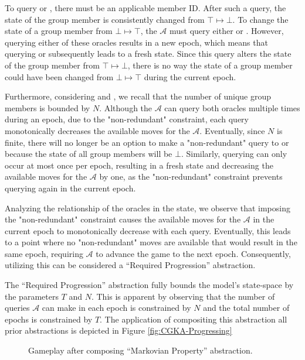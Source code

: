 \documentclass[runningheads]{llncs}
\newcommand{\Adversary}{\ensuremath{\mathcal{A}}\xspace}
\begin{document}
To query  or , there must be an applicable member ID.
After such a query, the state of the group member is consistently changed from $\top \mapsto \bot$.
To change the state of a group member from $\bot \mapsto \top$, the \Adversary must query either  or .
However, querying either of these oracles results in a new epoch, which means that querying  or  subsequently leads to a fresh state.
Since this query alters the state of the group member from $\top \mapsto \bot$, there is no way the state of a group member could have been changed from $\bot \mapsto \top$ during the current epoch.

Furthermore, considering  and , we recall that the number of unique group members is bounded by $N$.
Although the \Adversary can query both oracles multiple times during an epoch, due to the "non-redundant" constraint, each query monotonically decreases the available moves for the \Adversary.
Eventually, since $N$ is finite, there will no longer be an option to make a "non-redundant" query to  or  because the state of all group members will be $\bot$. Similarly, querying  can only occur at most once per epoch, resulting in a fresh state and decreasing the available moves for the \Adversary by one, as the "non-redundant" constraint prevents querying  again in the current epoch.

Analyzing the relationship of the oracles in the \CGKAsec state, we observe that imposing the "non-redundant" constraint causes the available moves for the \Adversary in the current epoch to monotonically decrease with each query. Eventually, this leads to a point where no "non-redundant" moves are available that would result in the same epoch, requiring \Adversary to advance the game to the next epoch.
Consequently, utilizing this can be considered a ``Required Progression''  abstraction.

The ``Required Progression''  abstraction fully bounds the model's state-space by the parameters $T$ and $N$.
This is apparent by observing that the number of queries \Adversary can make in each epoch is constrained by $N$ and the total number of epochs is constrained by $T$.
The application of compositing this abstraction all prior abstractions is depicted in Figure \ref{fig:CGKA-Progressing}

\begin{figure}
\centering
{}
\caption[Transition graph of informal CGKA definition]{%
\label{fig:CGKA-Progressing}%
Gameplay after composing ``Required Progression'' abstraction.%
}%
\vfill
{}
\caption[Transition graph of informal CGKA definition]{%
\label{fig:CGKA-Markovian}%
Gameplay after composing ``Markovian Property'' abstraction.%
}%
\end{figure}
\end{document}
